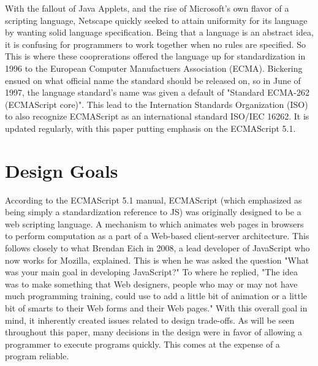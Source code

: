 \documentclass[man]{apa}
\begin{document}
With the fallout of Java Applets, and the rise of Microsoft's own flavor of a scripting language, Netscape quickly seeked to attain uniformity for its language by wanting solid language specification. Being that a language is an abstract idea, it is confusing for programmers to work together when no rules are specified. So This is where these cooprerations offered the language up for standardization in 1996 to the European Computer Manufactuers Association (ECMA). Bickering ensued on what official name the standard should be released on, so in June of 1997, the language standard's name was given a default of "Standard ECMA-262 (ECMAScript core)". This lead to the Internation Standards Organization (ISO) to also recognize ECMAScript as an international standard ISO/IEC 16262. It is updated regularly, with this paper putting emphasis on the ECMAScript 5.1.


\section{Design Goals}

According to the ECMAScript 5.1 manual, ECMAScript (which emphasized as being simply a standardization reference to JS) was originally designed to be a web scripting language. A mechanism to which animates web pages in browsers to perform computation as a part of a Web-based client-server architecture. This follows closely to what Brendan Eich in 2008, a lead developer of JavaScript who now works for Mozilla, explained. This is when he was asked the question "What was your main goal in developing JavaScript?" To where he replied, "The idea was to make something that Web designers, people who may or may not have much programming training, could use to add a little bit of animation or a little bit of smarts to their Web forms and their Web pages." With this overall goal in mind, it inherently created issues related to design trade-offs. As will be seen throughout this paper, many decisions in the design were in favor of allowing a programmer to execute programs quickly. This comes at the expense of a program reliable.
\end{document}
